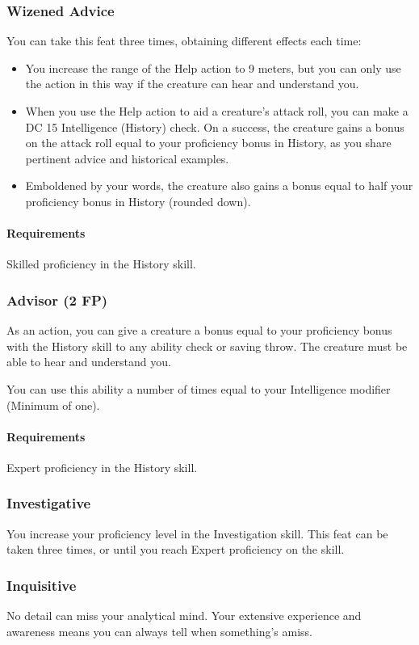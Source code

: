 \subsubsection{Wizened Advice} \label{feat::wizenedadvice}
    You can take this feat three times, obtaining different effects each time:
    \begin{itemize}
        \item You increase the range of the Help action to 9 meters, but you can only use the action in this way if the creature can hear and understand you.
        \item When you use the Help action to aid a creature's attack roll, you can make a DC 15 Intelligence (History) check.
        On a success, the creature gains a bonus on the attack roll equal to your proficiency bonus in History, as you share pertinent advice and historical examples.
        \item Emboldened by your words, the creature also gains a bonus equal to half your proficiency bonus in History (rounded down).
    \end{itemize}
    \paragraph{Requirements} Skilled proficiency in the History skill.
\subsubsection{Advisor (2 FP)} \label{feat::advisor}
    As an action, you can give a creature a bonus equal to your proficiency bonus with the History skill to any ability check or saving throw.
    The creature must be able to hear and understand you.

    You can use this ability a number of times equal to your Intelligence modifier (Minimum of one).
    \paragraph{Requirements} Expert proficiency in the History skill.
\subsubsection{Investigative} \label{feat::investigative}
    You increase your proficiency level in the Investigation skill.
    This feat can be taken three times, or until you reach Expert proficiency on the skill.
\subsubsection{Inquisitive} \label{feat::inquisitive}
    No detail can miss your analytical mind.
    Your extensive experience and awareness means you can always tell when something's amiss.


